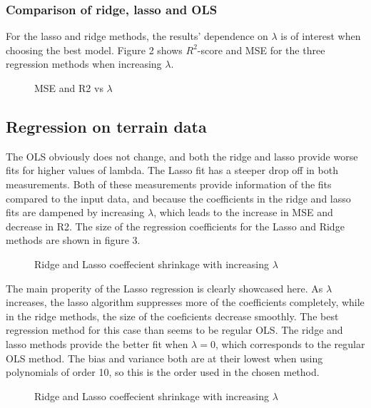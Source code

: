 \documentclass{emulateapj}
\begin{document}
\subsubsection{Comparison of ridge, lasso and OLS}
For the lasso and ridge methods, the results' dependence on $\lambda$ is of interest when choosing the best model. Figure 2 shows $R^2$-score and MSE for the three regression methods when increasing $\lambda$.
\begin{figure}[t]

\mbox{}
\mbox{}
\caption{MSE and R2 vs $\lambda$}
\label{fig:figure_label}
\end{figure}
\subsection{Regression on terrain data}
The OLS obviously does not change, and both the ridge and lasso provide worse fits for higher values of lambda. The Lasso fit has a steeper drop off in both measurements. Both of these measurements provide information of the fits compared to the input data, and because the coefficients in the ridge and lasso fits are dampened by increasing $\lambda$, which leads to the increase in MSE and decrease in R2. The size of the regression coefficients for the Lasso and Ridge methods are shown in figure 3. 
\begin{figure}[t]

\mbox{}
\mbox{}
\caption{Ridge and Lasso coeffecient shrinkage with increasing $\lambda$}
\label{fig:figure_label}
\end{figure}
The main properity of the Lasso regression is clearly showcased here. As $\lambda$ increases, the lasso algorithm suppresses more of the coefficients completely, while in the ridge methods, the size of the coeficients decrease smoothly. The best regression method for this case than seems to be regular OLS. The ridge and lasso methods provide the better fit when $\lambda = 0$, which corresponds to the regular OLS method. The bias and variance both are at their lowest when using polynomials of order 10, so this is the order used in the chosen method. 
\begin{figure}[t]

\mbox{}
\mbox{}
\caption{Ridge and Lasso coeffecient shrinkage with increasing $\lambda$}
\label{fig:figure_label}
\end{figure}
\end{document}
